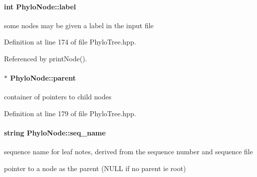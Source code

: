 \hypertarget{classPhyloNode_a4abacdd01e6c36193c6372758a05debf}{
\paragraph[{label}]{\setlength{\rightskip}{0pt plus 5cm}int {\bf \-Phylo\-Node\-::label}}}\label{classPhyloNode_a4abacdd01e6c36193c6372758a05debf}


some nodes may be given a label in the input file 



\-Definition at line 174 of file \-Phylo\-Tree.\-hpp.



\-Referenced by print\-Node().

\hypertarget{classPhyloNode_a3625b4a3634e7662fdb063b14ce21482}{
\paragraph[{parent}]{$\ast$ {\bf \-Phylo\-Node\-::parent}}}\label{classPhyloNode_a3625b4a3634e7662fdb063b14ce21482}


container of pointers to child nodes 



\-Definition at line 179 of file \-Phylo\-Tree.\-hpp.

\hypertarget{classPhyloNode_aa99afd949e72b932d9c0d89d06c2a890}{
\paragraph[{seq\-\_\-name}]{\setlength{\rightskip}{0pt plus 5cm}string {\bf \-Phylo\-Node\-::seq\-\_\-name}}}\label{classPhyloNode_aa99afd949e72b932d9c0d89d06c2a890}


sequence name for leaf notes, derived from the sequence number and sequence file 

pointer to a node as the parent (\-N\-U\-L\-L if no parent ie root) 

